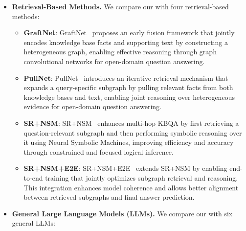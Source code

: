 \begin{itemize}
\begin{itemize}
\end{itemize}

\item \textbf{Retrieval-Based Methods.} We compare our \method{} with four retrieval-based methods:

\begin{itemize}
    \item \textbf{GraftNet}: GraftNet~\cite{sun2018open} proposes an early fusion framework that jointly encodes knowledge base facts and supporting text by constructing a heterogeneous graph, enabling effective reasoning through graph convolutional networks for open-domain question answering.
    \item \textbf{PullNet}: PullNet~\cite{sun2019pullnet} introduces an iterative retrieval mechanism that expands a query-specific subgraph by pulling relevant facts from both knowledge bases and text, enabling joint reasoning over heterogeneous evidence for open-domain question answering. 
    \item \textbf{SR+NSM}: SR+NSM~\cite{zhang2022subgraph} enhances multi-hop KBQA by first retrieving a question-relevant subgraph and then performing symbolic reasoning over it using Neural Symbolic Machines, improving efficiency and accuracy through constrained and focused logical inference.
    \item \textbf{SR+NSM+E2E}: SR+NSM+E2E~\cite{zhang2022subgraph} extends SR+NSM by enabling end-to-end training that jointly optimizes subgraph retrieval and reasoning. This integration enhances model coherence and allows better alignment between retrieved subgraphs and final answer prediction.
\end{itemize}


    \item  \textbf{General
Large Language Models (LLMs).} We compare our \method{} with six general
LLMs:

\begin{itemize}


\end{itemize}
\end{itemize}
